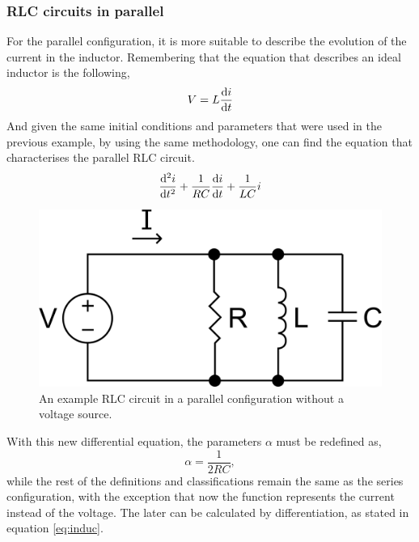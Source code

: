 \documentclass[12pt,twoside]{extarticle}
\begin{document}
\subsubsection{RLC circuits in parallel}
For the parallel configuration, it is more suitable to describe the evolution of the current in the inductor. Remembering that the equation that describes an ideal inductor is the following,
\begin{equation}\label{eq:induc}
    V = L \dv{i}{t}
\end{equation}
And given the same initial conditions and parameters that were used in the previous example, by using the same methodology, one can find the equation that characterises the parallel RLC circuit.
\begin{equation}
    \dv[2]{i}{t} + \frac{1}{RC}\dv{i}{t} +\frac{1}{LC}{i}
\end{equation}
\begin{figure}[ht]
    \centering
    \includegraphics[width=0.6\columnwidth]{figures/RLC_parallel.png}
    \caption{An example RLC circuit in a parallel configuration without a voltage source.}
    \label{fig:parallelRLC}
\end{figure}
With this new differential equation, the parameters $\alpha$ must be redefined as,
\begin{equation}
    \alpha = \frac{1}{2RC},
\end{equation}
while the rest of the definitions and classifications remain the same as the series configuration, with the exception that now the function represents the current instead of the voltage. The later can be calculated by differentiation, as stated in equation \ref{eq:induc}.
\end{document}
